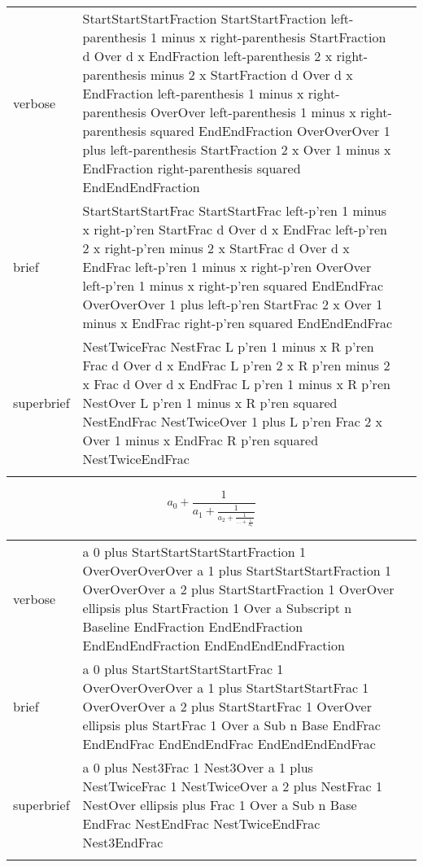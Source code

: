 \begin{longtable}[c]{@{}lll@{}}
\toprule\addlinespace
verbose & StartStartStartFraction StartStartFraction left-parenthesis 1
minus x right-parenthesis StartFraction d Over d x EndFraction
left-parenthesis 2 x right-parenthesis minus 2 x StartFraction d Over d
x EndFraction left-parenthesis 1 minus x right-parenthesis OverOver
left-parenthesis 1 minus x right-parenthesis squared EndEndFraction
OverOverOver 1 plus left-parenthesis StartFraction 2 x Over 1 minus x
EndFraction right-parenthesis squared EndEndEndFraction &

\\\addlinespace
brief & StartStartStartFrac StartStartFrac left-p'ren 1 minus x
right-p'ren StartFrac d Over d x EndFrac left-p'ren 2 x right-p'ren
minus 2 x StartFrac d Over d x EndFrac left-p'ren 1 minus x right-p'ren
OverOver left-p'ren 1 minus x right-p'ren squared EndEndFrac
OverOverOver 1 plus left-p'ren StartFrac 2 x Over 1 minus x EndFrac
right-p'ren squared EndEndEndFrac &

\\\addlinespace
superbrief & NestTwiceFrac NestFrac L p'ren 1 minus x R p'ren Frac d
Over d x EndFrac L p'ren 2 x R p'ren minus 2 x Frac d Over d x EndFrac L
p'ren 1 minus x R p'ren NestOver L p'ren 1 minus x R p'ren squared
NestEndFrac NestTwiceOver 1 plus L p'ren Frac 2 x Over 1 minus x EndFrac
R p'ren squared NestTwiceEndFrac &

\\\addlinespace
\bottomrule
\end{longtable}



\E \[a_0+\frac{1}{a_1+\frac{1}{a_2+\frac{1}{\ldots + \frac{1}{a_n}}}}\]
\begin{longtable}[c]{@{}lll@{}}
\toprule\addlinespace
verbose & a 0 plus StartStartStartStartFraction 1 OverOverOverOver a 1
plus StartStartStartFraction 1 OverOverOver a 2 plus StartStartFraction
1 OverOver ellipsis plus StartFraction 1 Over a Subscript n Baseline
EndFraction EndEndFraction EndEndEndFraction EndEndEndEndFraction &

\\\addlinespace
brief & a 0 plus StartStartStartStartFrac 1 OverOverOverOver a 1 plus
StartStartStartFrac 1 OverOverOver a 2 plus StartStartFrac 1 OverOver
ellipsis plus StartFrac 1 Over a Sub n Base EndFrac EndEndFrac
EndEndEndFrac EndEndEndEndFrac &

\\\addlinespace
superbrief & a 0 plus Nest3Frac 1 Nest3Over a 1 plus NestTwiceFrac 1
NestTwiceOver a 2 plus NestFrac 1 NestOver ellipsis plus Frac 1 Over a
Sub n Base EndFrac NestEndFrac NestTwiceEndFrac Nest3EndFrac &

\\\addlinespace
\bottomrule
\end{longtable}


